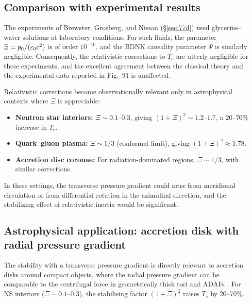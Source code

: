 \subsection{Comparison with experimental results}
\label{sec:rel-77d}

The experiments of Brewster, Grosberg, and Nissan (\S\ref{sec:77d})
used glycerine--water solutions at laboratory conditions.  For such
fluids, the parameter $\Xi = p_0/(\varepsilon_0 c^2)$ is of order
$10^{-10}$, and the BDNK causality parameter $\Psi$ is
similarly negligible.  Consequently, the relativistic corrections to
$T_c$ are utterly negligible for these experiments, and the excellent
agreement between the classical theory and the experimental data
reported in Fig.~91 is unaffected.

Relativistic corrections become observationally relevant only in
astrophysical contexts where $\Xi$ is appreciable:
\begin{itemize}
\item \textbf{Neutron star interiors:} $\Xi \sim 0.1$--$0.3$,
  giving $(1+\Xi)^2 \sim 1.2$--$1.7$, a 20--70\% increase in $T_c$.
\item \textbf{Quark--gluon plasma:} $\Xi \sim 1/3$ (conformal limit),
  giving $(1+\Xi)^2 \approx 1.78$.
\item \textbf{Accretion disc coronae:} For radiation-dominated
  regions, $\Xi \sim 1/3$, with similar corrections.
\end{itemize}
In these settings, the transverse pressure gradient could arise from
meridional circulation or from differential rotation in the azimuthal
direction, and the stabilizing effect of relativistic inertia would
be significant.

\subsection{Astrophysical application: accretion disk with radial
  pressure gradient}
\label{sec:rel-77-astro}

The stability with a transverse pressure gradient is directly relevant
to accretion disks around compact objects, where the radial pressure
gradient can be comparable to the centrifugal force in geometrically
thick tori and ADAFs \cite{NarayanYi1994,AbramowiczFragile2013}.
For NS interiors ($\Xi \sim 0.1$--$0.3$), the stabilising factor
$(1 + \Xi)^2$ raises $T_c$ by 20--70\%.

